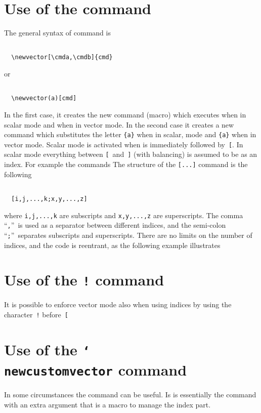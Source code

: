 \documentclass[a4paper,final,11pt]{article}
\begin{document}
\section{Use of the  command}
The general syntax of  command is
\begin{verbatim}

  \newvector[\cmda,\cmdb]{cmd}

\end{verbatim}
or
\begin{verbatim}

  \newvector(a)[cmd]

\end{verbatim}
In the first case, it creates the new command (macro) 
which executes  when in scalar mode and 
when in vector mode.  In the second case it creates a new command
 which substitutes the letter \verb'{a}'
when in scalar, mode and \verb'{a}' when in vector
mode.  Scalar mode is activated when  is immediately
followed by~\verb|[|.  In scalar mode everything between
\verb|[|~and~\verb|]| (with balancing) is assumed to be as an index.
For example the commands
%
The structure of the \verb|[...]| command is the following
\begin{verbatim}

  [i,j,...,k;x,y,...,z]

\end{verbatim}
where \verb|i,j,...,k| are subscripts and \verb|x,y,...,z| are
superscripts.  The comma ``\verb|,|''~is used as a separator
between different indices, and the semi-colon ``\verb|;|''~separates
subscripts and superscripts.  There are no limits on the number of
indices, and the code is reentrant, as the following example
illustrates

\section{Use of the \texttt{!} command}
It is possible to enforce vector mode also when using indices
by using the character~\verb'!' before~\verb'['

\section{Use of the \texttt{\char`\\newcustomvector} command}
In some circumstances the command  can be
useful.  Is is essentially the  command with an
extra argument that is a macro to manage the index part.
\end{document}
